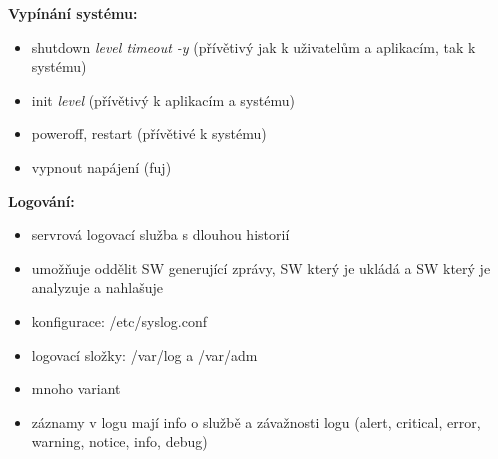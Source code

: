 \textbf{Vypínání systému:}
\begin{itemize}
    \item shutdown \textit{level timeout -y} (přívětivý jak k uživatelům a aplikacím, tak k systému)
    \item init \textit{level} (přívětivý k aplikacím a systému)
    \item poweroff, restart (přívětivé k systému)
    \item vypnout napájení (fuj)
\end{itemize}

\textbf{Logování:}
\begin{itemize}
	\item servrová logovací služba s dlouhou historií
	\item umožňuje oddělit SW generující zprávy, SW který je ukládá a SW který je analyzuje a nahlašuje
	\item konfigurace: /etc/syslog.conf
	\item logovací složky: /var/log a /var/adm
	\item mnoho variant
	\item záznamy v logu mají info o službě a závažnosti logu (alert, critical, error, warning, notice, info, debug)
\end{itemize}